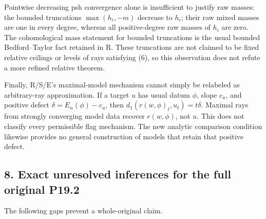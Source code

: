 \documentclass[
  11pt,
]{article}
\begin{document}
Pointwise decreasing psh convergence alone is insufficient to justify
raw masses: the bounded truncations \(\max(h_i,-m)\) decrease to
\(h_i\); their raw mixed masses are one in every degree, whereas all
positive-degree raw masses of \(h_i\) are zero. The cohomological mass
statement for bounded truncations is the usual bounded Bedford--Taylor
fact retained in R. These truncations are not claimed to be fixed
relative ceilings or levels of rays satisfying (6), so this observation
does not refute a more refined relative theorem.

Finally, R/S/E's maximal-model mechanism cannot simply be relabeled as
arbitrary-ray approximation. If a target \(u\) has usual datum \(\phi\),
slope \(c_u\), and positive defect \(\delta=E_\alpha(\phi)-c_u\), then
\(d_1(r(w,\phi)_t,u_t)=t\delta\). Maximal rays from strongly converging
model data recover \(r(w,\phi)\), not \(u\). This does not classify
every permissible flag mechanism. The new analytic comparison condition
likewise provides no general construction of models that retain that
positive defect.

\subsection{8. Exact unresolved inferences for the full original
P19.2}\label{exact-unresolved-inferences-for-the-full-original-p19.2}

The following gaps prevent a whole-original claim.
\end{document}
